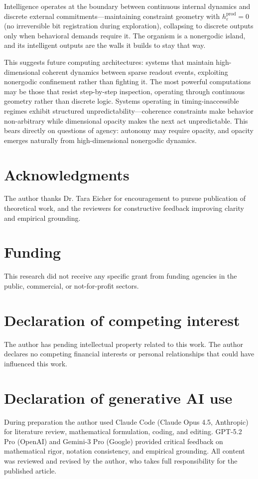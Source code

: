 \documentclass[12pt]{article}
\begin{document}
Intelligence operates at the boundary between continuous internal dynamics and discrete external commitments---maintaining constraint geometry with $h_\varepsilon^{\text{prod}} = 0$ (no irreversible bit registration during exploration), collapsing to discrete outputs only when behavioral demands require it. The organism is a nonergodic island, and its intelligent outputs are the walls it builds to stay that way.

This suggests future computing architectures: systems that maintain high-dimensional coherent dynamics between sparse readout events, exploiting nonergodic confinement rather than fighting it. The most powerful computations may be those that resist step-by-step inspection, operating through continuous geometry rather than discrete logic. Systems operating in timing-inaccessible regimes exhibit structured unpredictability---coherence constraints make behavior non-arbitrary while dimensional opacity makes the next act unpredictable. This bears directly on questions of agency: autonomy may require opacity, and opacity emerges naturally from high-dimensional nonergodic dynamics.

\section*{Acknowledgments}
The author thanks Dr. Tara Eicher for encouragement to pursue publication of theoretical work, and the reviewers for constructive feedback improving clarity and empirical grounding.

\section*{Funding}
This research did not receive any specific grant from funding agencies in the public, commercial, or not-for-profit sectors.

\section*{Declaration of competing interest}
The author has pending intellectual property related to this work. The author declares no competing financial interests or personal relationships that could have influenced this work.

\section*{Declaration of generative AI use}
During preparation the author used Claude Code (Claude Opus 4.5, Anthropic) for literature review, mathematical formulation, coding, and editing. GPT-5.2 Pro (OpenAI) and Gemini-3 Pro (Google) provided critical feedback on mathematical rigor, notation consistency, and empirical grounding. All content was reviewed and revised by the author, who takes full responsibility for the published article.
\end{document}
